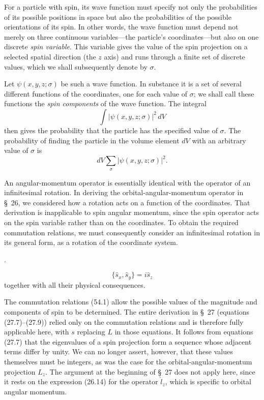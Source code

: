For a particle with spin, its wave function must specify not only the
probabilities of its possible positions in space but also the probabilities
of the possible orientations of its spin. In other words, the wave function
must depend not merely on three continuous variables---the particle's
coordinates---but also on one discrete \emph{spin variable}. This variable
gives the value of the spin projection on a selected spatial direction (the
$z$ axis) and runs through a finite set of discrete values, which we shall
subsequently denote by $\sigma$.

Let $\psi(x,y,z;\sigma)$ be such a wave function. In substance it is a set of
several different functions of the coordinates, one for each value of
$\sigma$; we shall call these functions the \emph{spin components} of the wave
function. The integral
\[
 \int |\psi(x,y,z;\sigma)|^2\,dV
\]
then gives the probability that the particle has the specified value of
$\sigma$. The probability of finding the particle in the volume element $dV$
with an arbitrary value of $\sigma$ is
\[
 dV\sum_\sigma |\psi(x,y,z;\sigma)|^2.
\]



An angular-momentum operator is essentially identical with the operator of an
infinitesimal rotation. In deriving the orbital-angular-momentum operator in
\S~26, we considered how a rotation acts on a function of the coordinates.
That derivation is inapplicable to spin angular momentum, since the spin
operator acts on the spin variable rather than on the coordinates. To obtain
the required commutation relations, we must consequently consider an
infinitesimal rotation in its general form, as a rotation of the coordinate
system. 


.

\begin{equation}
 \{\hat s_x,\hat s_y\}=i\hat s_z
 \tag{54.1}
\end{equation}
together with all their physical consequences.

The commutation relations (54.1) allow the possible values of the magnitude
and components of spin to be determined. The entire derivation in \S~27
(equations (27.7)--(27.9)) relied only on the commutation relations and is
therefore fully applicable here, with $s$ replacing $L$ in those equations.
It follows from equations (27.7) that the eigenvalues of a spin projection
form a sequence whose adjacent terms differ by unity. We can no longer assert,
however, that these values themselves must be integers, as was the case for
the orbital-angular-momentum projection $L_z$. The argument at the beginning
of \S~27 does not apply here, since it rests on the expression (26.14) for the
operator $\hat l_z$, which is specific to orbital angular momentum.

